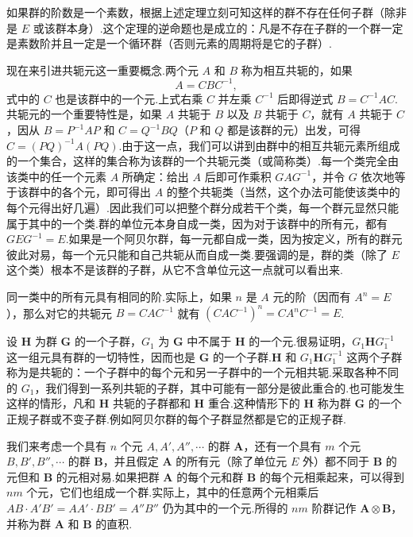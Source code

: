 如果群的阶数是一个素数，根据上述定理立刻可知这样的群不存在任何子群（除非是 $E$ 或该群本身）.这个定理的逆命题也是成立的：凡是不存在子群的一个群一定是素数阶并且一定是一个循环群（否则元素的周期将是它的子群）.

现在来引进共轭元这一重要概念.两个元 $A$ 和 $B$ 称为相互共轭的，如果
\begin{equation*}
  A=CBC^{-1},
\end{equation*}
式中的 $C$ 也是该群中的一个元.上式右乘 $C$ 并左乘 $C^{-1}$ 后即得逆式 $B=C^{-1}AC$.共轭元的一个重要特性是，如果 $A$ 共轭于 $B$ 以及 $B$ 共轭于 $C$，就有 $A$ 共轭于 $C$，因从 $B=P^{-1}AP$ 和 $C=Q^{-1}BQ$（$P$ 和 $Q$ 都是该群的元）出发，可得 $C=(PQ)^{-1}A(PQ)$.由于这一点，我们可以讲到由群中的相互共轭元素所组成的一个集合，这样的集合称为该群的一个共轭元类（或简称类）.每一个类完全由该类中的任一个元素 $A$ 所确定：给出 $A$ 后即可作乘积 $GAG^{-1}$，并令 $G$ 依次地等于该群中的各个元，即可得出 $A$ 的整个共轭类（当然，这个办法可能使该类中的每个元得出好几遍）.因此我们可以把整个群分成若干个类，每一个群元显然只能属于其中的一个类.群的单位元本身自成一类，因为对于该群中的所有元，都有 $GEG^{-1}=E$.如果是一个阿贝尔群，每一元都自成一类，因为按定义，所有的群元彼此对易，每一个元只能和自己共轭从而自成一类.要强调的是，群的类（除了 $E$ 这个类）根本不是该群的子群，从它不含单位元这一点就可以看出来.

同一类中的所有元具有相同的阶.实际上，如果 $n$ 是 $A$ 元的阶（因而有 $A^n=E$），那么对它的共轭元 $B=CAC^{-1}$ 就有 $(CAC^{-1})^n=CA^nC^{-1}=E$.

设 $\boldsymbol{H}$ 为群 $\boldsymbol{G}$ 的一个子群，$G_1$ 为 $\boldsymbol{G}$ 中不属于 $\boldsymbol{H}$ 的一个元.很易证明，$G_1\boldsymbol{H}G_1^{-1}$ 这一组元具有群的一切特性，因而也是 $\boldsymbol{G}$ 的一个子群.$\boldsymbol{H}$ 和 $G_1\boldsymbol{H}G_1^{-1}$ 这两个子群称为是共轭的：一个子群中的每个元和另一子群中的一个元相共轭.采取各种不同的 $G_1$，我们得到一系列共轭的子群，其中可能有一部分是彼此重合的.也可能发生这样的情形，凡和 $\boldsymbol{H}$ 共轭的子群都和 $\boldsymbol{H}$ 重合.这种情形下的 $\boldsymbol{H}$ 称为群 $\boldsymbol{G}$ 的一个正规子群或不变子群.例如阿贝尔群的每个子群显然都是它的正规子群.

我们来考虑一个具有 $n$ 个元 $A,A',A'',\cdots$ 的群 $\boldsymbol{A}$，还有一个具有 $m$ 个元 $B,B',B'',\cdots$ 的群 $\boldsymbol{B}$，并且假定 $\boldsymbol{A}$ 的所有元（除了单位元 $E$ 外）都不同于 $\boldsymbol{B}$ 的元但和 $\boldsymbol{B}$ 的元相对易.如果把群 $\boldsymbol{A}$ 的每个元和群 $\boldsymbol{B}$ 的每个元相乘起来，可以得到 $nm$ 个元，它们也组成一个群.实际上，其中的任意两个元相乘后 $AB\cdot A'B'=AA'\cdot BB'=A''B''$ 仍为其中的一个元.所得的 $nm$ 阶群记作 $\boldsymbol{A}\otimes\boldsymbol{B}$，并称为群 $\boldsymbol{A}$ 和 $\boldsymbol{B}$ 的直积.

